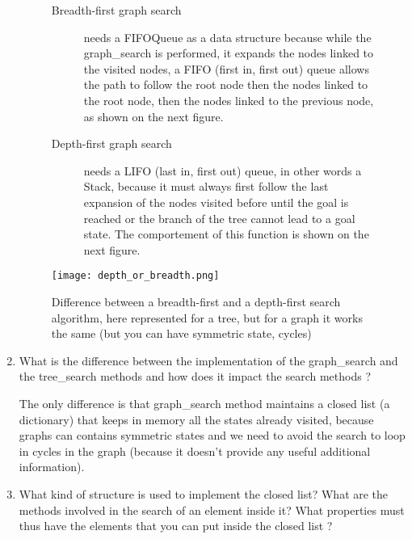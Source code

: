 \begin{enumerate}
\begin{figure}[!ht]
\begin{framed}
\begin{description}
                \item[Breadth-first graph search] needs a FIFOQueue as a
                    data structure because while the graph\_search is
                    performed, it expands the nodes linked to the visited
                    nodes, a FIFO (first in, first out) queue allows the
                    path to follow the root node then the nodes linked to
                    the root node, then the nodes linked to the previous
                    node, as shown on the next figure.
                \item[Depth-first graph search] needs a LIFO (last in,
                    first out) queue, in other words a Stack, because it
                    must always first follow the last expansion of the
                    nodes visited before until the goal is reached or the
                    branch of the tree cannot lead to a goal state. The
                    comportement of this function is shown on the next
                    figure.
            \end{description}
                \centering
                \texttt{[image: depth\_or\_breadth.png]}
                \caption{Difference between a breadth-first and a depth-first
                search algorithm, here represented for a tree, but for a
                graph it works the same (but you can have symmetric state,
                cycles)}
        \end{framed}
        \end{figure}
        \FloatBarrier
    \item What is the difference between the implementation of the
        graph\_search and the tree\_search methods and how does it impact
        the search methods ?
        \begin{framed}
            The only difference is that graph\_search method maintains a
            closed list (a dictionary) that keeps in memory all the states
            already visited, because graphs can contains symmetric states
            and we need to avoid the search to loop in cycles in the graph
            (because it doesn't provide any useful additional information).
        \end{framed}
    \item What kind of structure is used to implement the closed list?
        What are the methods involved in the search of an element inside
        it? What properties must thus have the elements that you can put
        inside the closed list ?
        \begin{framed}

\end{framed}
\end{enumerate}
